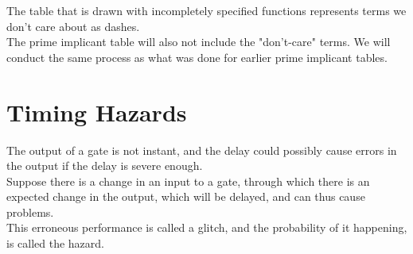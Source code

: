 \documentclass[nobib]{tufte-handout}
\begin{document}
\begin{mdframed}
\begin{center}
        \end{center}
    \end{mdframed}
    The table that is drawn with incompletely specified functions represents terms we don't care about as dashes.\\
    The prime implicant table will also not include the "don't-care" terms. We will conduct the same process as what was done for earlier prime implicant tables.\\
    \section{Timing Hazards}
    The output of a gate is not instant, and the delay could possibly cause errors
    in the output if the delay is severe enough.\\ Suppose there is a change in an
    input to a gate, through which there is an expected change in the output, which
    will be delayed, and can thus cause problems.\\ This erroneous performance is
    called a glitch, and the probability of it happening, is called the hazard.\\
\end{document}
